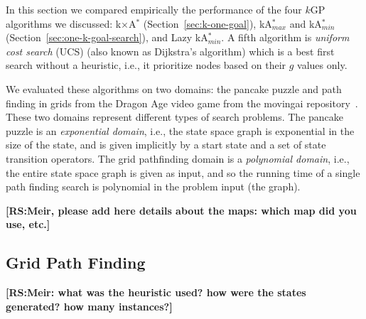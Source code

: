 \documentclass{aicom2e}
\newcommand{\kgs}{$k$GP}
\newcommand{\kastarmin}{kA$^*_{min}$}
\newcommand{\kastarmax}{kA$^*_{max}$}
\newcommand{\kxastar}{k$\times$A$^*$}
\newcommand{\roni}[1]{\textbf{[RS:#1]}}
\begin{document}
In this section we compared empirically the performance of the four \kgs{}
algorithms we discussed: \kxastar{} (Section~\ref{sec:k-one-goal}),
\kastarmax{} and \kastarmin{}(Section~\ref{sec:one-k-goal-search}), and Lazy
\kastarmin{}. A fifth algorithm is {\em uniform cost search} (UCS) (also known
as Dijkstra's algorithm) which is a best first search without a heuristic,
i.e., it prioritize nodes based on their $g$ values only.


We evaluated these algorithms on two domains: the pancake puzzle and path
finding in grids from the Dragon Age video game from the movingai
repository~\cite{sturtevant2012benchmarks}. These two domains represent
different types of search problems. The pancake puzzle is an {\em exponential
domain}, i.e., the state space graph is exponential in the size of the state,
and is given implicitly by a start state and a set of state transition
operators. The grid pathfinding domain is a {\em polynomial domain}, i.e., the
entire state space graph is given as input, and so the running time of a single
path finding search is polynomial in the problem input (the graph).

\roni{Meir, please add here details about the maps: which map did you use, etc.}
\subsection{Grid Path Finding}
\roni{Meir: what was the heuristic used? how were the states generated? how many instances?}
\end{document}
